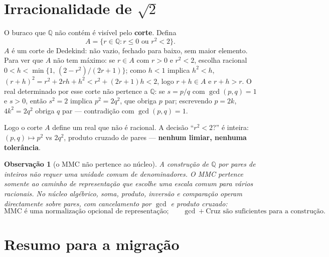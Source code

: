 \documentclass[11pt,a4paper]{article}
\newtheorem{observacao}{Observação}
\begin{document}
\section{Irracionalidade de $\sqrt{2}$}\label{sec:sqrt2}

O buraco que $\mathbb{Q}$ não contém é visível pelo \textbf{corte}.
Defina
\[
A = \{r\in\mathbb{Q}: r\leq 0 \text{ ou } r^2 < 2\}.
\]
$A$ é um corte de Dedekind: não vazio, fechado para baixo, sem maior elemento.
Para ver que $A$ não tem máximo: se $r\in A$ com $r>0$ e $r^{2}<2$, escolha
racional $0<h<\min\{1,\,(2-r^{2})/(2r+1)\}$; como $h<1$ implica $h^{2}<h$,
$(r+h)^{2}=r^{2}+2rh+h^{2}<r^{2}+(2r+1)h<2$, logo $r+h\in A$ e $r+h>r$.
O real determinado por esse corte não pertence a $\mathbb{Q}$: se $s=p/q$ com $\gcd(p,q)=1$ e $s>0$,
então $s^{2}=2$ implica $p^{2}=2q^{2}$, que obriga $p$ par; escrevendo $p=2k$,
$4k^{2}=2q^{2}$ obriga $q$ par --- contradição com $\gcd(p,q)=1$.

\noindent Logo o corte $A$ define um real que não é racional. A decisão
``$r^{2}<2$?'' é inteira: $(p,q)\mapsto p^{2}$ vs $2q^{2}$, produto cruzado
de pares --- \textbf{nenhum limiar, nenhuma tolerância}.

\begin{observacao}[o MMC não pertence ao núcleo]
A construção de $\mathbb{Q}$ por pares de inteiros não requer uma unidade
comum de denominadores. O MMC pertence somente ao caminho de representação que
escolhe uma escala comum para vários racionais. No núcleo algébrico, soma,
produto, inversão e comparação operam directamente sobre pares, com
cancelamento por $\gcd$ e produto cruzado:
\[
\text{MMC é uma normalização opcional de representação;}\qquad
\gcd + \text{Cruz são suficientes para a construção.}
\]
\end{observacao}

\section{Resumo para a migração}\label{sec:migra}
\end{document}
